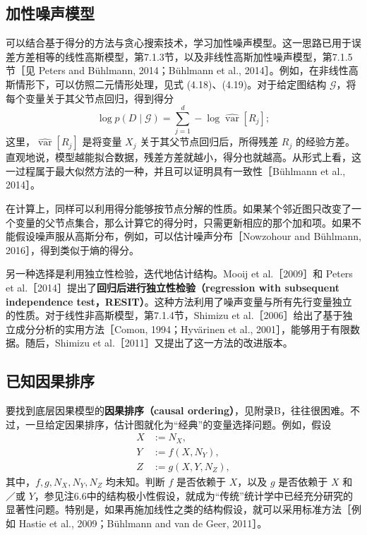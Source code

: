 \subsection{加性噪声模型}

可以结合基于得分的方法与贪心搜索技术，学习加性噪声模型。这一思路已用于误差方差相等的线性高斯模型，第7.1.3节，以及非线性高斯加性噪声模型，第7.1.5节［见 Peters and Bühlmann, 2014；Bühlmann et al., 2014］。例如，在非线性高斯情形下，可以仿照二元情形处理，见式 (4.18)、(4.19)。对于给定图结构 $\mathcal G$，将每个变量关于其父节点回归，得到得分
\[
 \log p(D\mid\mathcal G)
 =\sum_{j=1}^d-\log\widehat{\operatorname{var}}[R_j];
\]
这里，$\widehat{\operatorname{var}}[R_j]$ 是将变量 $X_j$ 关于其父节点回归后，所得残差 $R_j$ 的经验方差。直观地说，模型越能拟合数据，残差方差就越小，得分也就越高。从形式上看，这一过程属于最大似然方法的一种，并且可以证明具有一致性［Bühlmann et al., 2014］。

在计算上，同样可以利用得分能够按节点分解的性质。如果某个邻近图只改变了一个变量的父节点集合，那么计算它的得分时，只需更新相应的那个加和项。如果不能假设噪声服从高斯分布，例如，可以估计噪声分布［Nowzohour and Bühlmann, 2016］，得到类似于熵的得分。

另一种选择是利用独立性检验，迭代地估计结构。Mooij et al.［2009］和 Peters et al.［2014］提出了\textbf{回归后进行独立性检验（regression with subsequent independence test，RESIT）}。这种方法利用了噪声变量与所有先行变量独立的性质。对于线性非高斯模型，第7.1.4节，Shimizu et al.［2006］给出了基于独立成分分析的实用方法［Comon, 1994；Hyvärinen et al., 2001］，能够用于有限数据。随后，Shimizu et al.［2011］又提出了这一方法的改进版本。

\subsection{已知因果排序}

要找到底层因果模型的\textbf{因果排序（causal ordering）}，见附录B，往往很困难。不过，一旦给定因果排序，估计图就化为“经典”的变量选择问题。例如，假设
\[
 \begin{aligned}
  X&:=N_X,\\
  Y&:=f(X,N_Y),\\
  Z&:=g(X,Y,N_Z),
 \end{aligned}
\]
其中，$f,g,N_X,N_Y,N_Z$ 均未知。判断 $f$ 是否依赖于 $X$，以及 $g$ 是否依赖于 $X$ 和／或 $Y$，参见注6.6中的结构极小性假设，就成为“传统”统计学中已经充分研究的显著性问题。特别是，如果再施加线性之类的结构假设，就可以采用标准方法［例如 Hastie et al., 2009；Bühlmann and van de Geer, 2011］。

